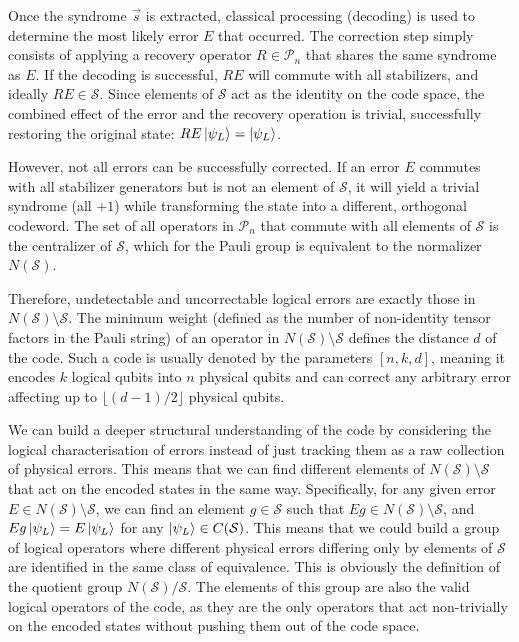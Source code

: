 \documentclass[12pt, twoside, openany]{book}
\begin{document}
Once the syndrome $\vec{s}$ is extracted, classical processing (decoding) is used to determine the most likely error $E$ that occurred. The correction step simply consists of applying a recovery operator $R \in \mathcal{P}_n$ that shares the same syndrome as $E$. If the decoding is successful, $RE$ will commute with all stabilizers, and ideally $RE \in \mathcal{S}$. Since elements of $\mathcal{S}$ act as the identity on the code space, the combined effect of the error and the recovery operation is trivial, successfully restoring the original state: $RE \ket{\psi_L} = \ket{\psi_L}$. 

However, not all errors can be successfully corrected. If an error $E$ commutes with all stabilizer generators but is not an element of $\mathcal{S}$, it will yield a trivial syndrome (all $+1$) while transforming the state into a different, orthogonal codeword. The set of all operators in $\mathcal{P}_n$ that commute with all elements of $\mathcal{S}$ is the centralizer of $\mathcal{S}$, which for the Pauli group is equivalent to the normalizer $N(\mathcal{S})$. 

Therefore, undetectable and uncorrectable logical errors are exactly those in $N(\mathcal{S}) \setminus \mathcal{S}$. The minimum weight (defined as the number of non-identity tensor factors in the Pauli string) of an operator in $N(\mathcal{S}) \setminus \mathcal{S}$ defines the distance $d$ of the code. Such a code is usually denoted by the parameters $[n, k, d]$, meaning it encodes $k$ logical qubits into $n$ physical qubits and can correct any arbitrary error affecting up to $\lfloor (d-1)/2 \rfloor$ physical qubits. 

We can build a deeper structural understanding of the code by considering the logical characterisation of errors instead of just tracking them as a raw collection of physical errors. This means that we can find different elements of $N(\mathcal{S}) \setminus \mathcal{S}$ that act on the encoded states in the same way. Specifically, for any given error $E \in N(\mathcal{S}) \setminus \mathcal{S}$, we can find an element $g \in \mathcal{S}$ such that $E g \in N(\mathcal{S}) \setminus \mathcal{S}$, and $E g \ket{\psi_L} = E \ket{\psi_L}$ for any $\ket{\psi_L} \in C(\mathcal{S})$. This means that we could build a group of logical operators where different physical errors differing only by elements of $\mathcal{S}$ are identified in the same class of equivalence. This is obviously the definition of the quotient group $N(\mathcal{S}) / \mathcal{S}$. The elements of this group are also the valid logical operators of the code, as they are the only operators that act non-trivially on the encoded states without pushing them out of the code space. \\
\end{document}

